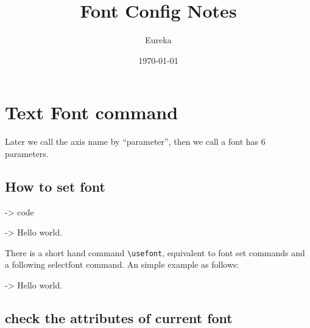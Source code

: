 \documentclass{article}
\title{Font Config Notes}
\author{Eureka}
\date{\today}
\begin{document}
\maketitle
\tableofcontents
\newpage

\section{Text Font command}
Later we call the axis name by ``parameter'', then we call a font has 6 parameters.

\subsection{How to set font}
\begin{code}
-> code
\end{code}

\begin{code}
\selectfont
-> Hello world.
\end{code}

There is a short hand command \verb |\usefont|, equivalent to font set commands and a following selectfont command. An simple 
example as follows:
\begin{code}
-> Hello world.
\end{code}


\subsection{check the attributes of current font}
\end{document}
